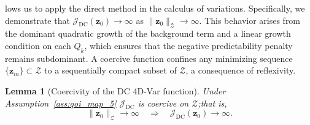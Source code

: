 \documentclass[final,1p,times]{elsarticle}
\newtheorem{lemma}{Lemma}[section]
\begin{document}
lows us to apply the direct method in the calculus of variations. 
Specifically, we demonstrate that $ \mathcal{J}_{\mathrm{DC}}(\mathbf{z}_0) \to \infty $ as $ \| \mathbf{z}_0 \|_{\mathcal{Z}} \to \infty $. 
This behavior arises from the dominant quadratic growth of the background term and a linear growth condition on each $ Q_k $, which ensures that the negative predictability penalty remains subdominant. 
A coercive function confines any minimizing sequence $ \{ \mathbf{z}_m \} \subset \mathcal{Z} $ to a sequentially compact subset of $ \mathcal{Z} $, a consequence of reflexivity. 

\begin{lemma}[Coercivity of the DC 4D-Var function]\label{lemma:coercivity}
Under Assumption~\ref{ass:qoi_map_5} $\mathcal{J}_{\mathrm{DC}}$ is coercive on $\mathcal{Z}$;that is,
\begin{equation}
\| \mathbf{z}_0 \|_{\mathcal{Z}} \to \infty \quad \Rightarrow \quad \mathcal{J}_{\mathrm{DC}}(\mathbf{z}_0) \to \infty.
\end{equation}
\end{lemma}
\end{document}
